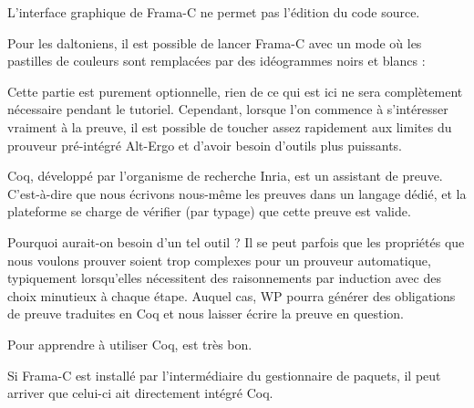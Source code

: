 \documentclass[middle]{zmdocument}
\begin{document}
\begin{Warning}
L'interface graphique de Frama-C ne permet pas l'édition du code source.
\end{Warning}


\begin{Information}
Pour les daltoniens, il est possible de lancer Frama-C avec un mode où les 
pastilles de couleurs sont remplacées par des idéogrammes noirs et blancs :

\end{Information}




Cette partie est purement optionnelle, rien de ce qui est ici ne sera 
complètement nécessaire pendant le tutoriel. Cependant, lorsque l'on commence à 
s'intéresser vraiment à la preuve, il est possible de toucher assez rapidement
aux limites du prouveur pré-intégré Alt-Ergo et d'avoir besoin d'outils plus 
puissants.





Coq, développé par l'organisme de recherche Inria, est un assistant de 
preuve. C'est-à-dire que nous écrivons nous-même les preuves dans un 
langage dédié, et la plateforme se charge de vérifier (par typage) que 
cette preuve est valide.



Pourquoi aurait-on besoin d'un tel outil ? Il se peut parfois que les 
propriétés que nous voulons prouver soient trop complexes pour un prouveur 
automatique, typiquement lorsqu'elles nécessitent des raisonnements par
induction avec des choix minutieux à chaque étape. Auquel cas, WP pourra 
générer des obligations de preuve traduites en Coq et nous laisser écrire 
la preuve en question.



Pour apprendre à utiliser Coq, 
est très bon.



\begin{Information}
Si Frama-C est installé par l'intermédiaire du gestionnaire de 
paquets, il peut arriver que celui-ci ait directement intégré Coq.
\end{Information}
\end{document}
